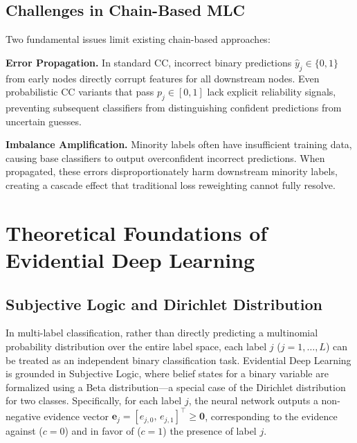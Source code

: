 \documentclass[conference]{IEEEtran}
\begin{document}
\subsection{Challenges in Chain-Based MLC}

Two fundamental issues limit existing chain-based approaches:

\textbf{Error Propagation.} In standard CC, incorrect binary predictions $\hat{y}_j \in \{0,1\}$ from early nodes directly corrupt features for all downstream nodes. Even probabilistic CC variants that pass $p_j \in [0,1]$ lack explicit reliability signals, preventing subsequent classifiers from distinguishing confident predictions from uncertain guesses.

\textbf{Imbalance Amplification.} Minority labels often have insufficient training data, causing base classifiers to output overconfident incorrect predictions. When propagated, these errors disproportionately harm downstream minority labels, creating a cascade effect that traditional loss reweighting cannot fully resolve.

\section{Theoretical Foundations of Evidential Deep Learning}

\subsection{Subjective Logic and Dirichlet Distribution}
In multi-label classification, rather than directly predicting a multinomial probability distribution over the entire label space, each label $j$ ($j = 1, \dots, L$) can be treated as an independent binary classification task. Evidential Deep Learning is grounded in Subjective Logic, where belief states for a binary variable are formalized using a Beta distribution—a special case of the Dirichlet distribution for two classes. Specifically, for each label $j$, the neural network outputs a non-negative evidence vector $\mathbf{e}_j = [e_{j,0},\, e_{j,1}]^\top \ge \mathbf{0}$, corresponding to the evidence against ($c=0$) and in favor of ($c=1$) the presence of label $j$.
\end{document}

